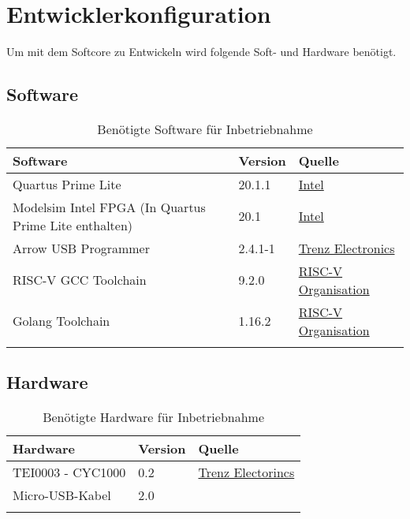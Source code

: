 \chapter{Entwicklerkonfiguration}
    Um mit dem Softcore zu Entwickeln wird folgende Soft- und Hardware benötigt.

    \section{Software}
        \begin{center}
            \begin{longtable}{| l | l | l |}
                \hline
                    Software & Version & Quelle \\
                \hline
                    Quartus Prime Lite & 20.1.1 & \href{https://fpgasoftware.intel.com/?edition=lite}{Intel}\\
                \hline
                    Modelsim Intel FPGA (In Quartus Prime Lite enthalten) & 20.1 & \href{https://fpgasoftware.intel.com/?product=modelsim_ae#tabs-2}{Intel}\\
                \hline
                    Arrow USB Programmer & 2.4.1-1 & \href{https://wiki.trenz-electronic.de/display/PD/Arrow+USB+Programmer#ArrowUSBProgrammer-DownloadSetupFiles}{Trenz Electronics}\\
                \hline
                    RISC-V GCC Toolchain & 9.2.0 & \href{https://github.com/riscv/riscv-gnu-toolchain}{RISC-V Organisation}\\
                \hline
                    Golang Toolchain & 1.16.2 & \href{https://golang.org/}{RISC-V Organisation}\\
                \hline
                \caption{Benötigte Software für Inbetriebnahme}
            \end{longtable}
        \end{center}

    \section{Hardware}
        \begin{center}
            \begin{longtable}{| l | l | l |}
                \hline
                    Hardware & Version & Quelle \\
                \hline
                    TEI0003 - CYC1000 & 0.2 & \href{https://wiki.trenz-electronic.de/display/PD/TEI0003+Getting+Started}{Trenz Electorincs}\\
                \hline
                    Micro-USB-Kabel & 2.0 & \\
                \hline
                \caption{Benötigte Hardware für Inbetriebnahme}
            \end{longtable}
        \end{center}